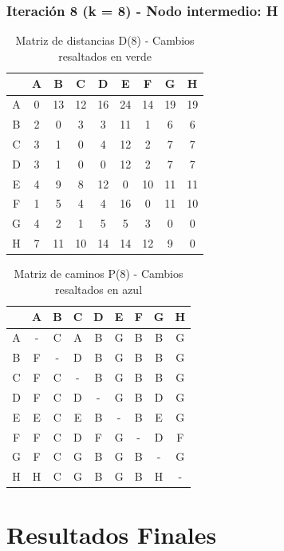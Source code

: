 \documentclass[12pt]{article}
\begin{document}
\clearpage
\subsubsection{Iteración 8 (k = 8) - Nodo intermedio: H}
\begin{table}[h!]
\centering
\begin{tabular}{|c|c|c|c|c|c|c|c|c|}
\hline
 & A & B & C & D & E & F & G & H \\\hline
A & 0 & 13 & 12 & 16 & 24 & 14 & 19 & 19 \\\hline
B & 2 & 0 & 3 & 3 & 11 & 1 & 6 & 6 \\\hline
C & 3 & 1 & 0 & 4 & 12 & 2 & 7 & 7 \\\hline
D & 3 & 1 & 0 & 0 & 12 & 2 & 7 & 7 \\\hline
E & 4 & 9 & 8 & 12 & 0 & 10 & 11 & 11 \\\hline
F & 1 & 5 & 4 & 4 & 16 & 0 & 11 & 10 \\\hline
G & 4 & 2 & 1 & 5 & 5 & 3 & 0 & 0 \\\hline
H & 7 & 11 & 10 & 14 & 14 & 12 & 9 & 0 \\\hline
\end{tabular}
\caption{Matriz de distancias D(8) - Cambios resaltados en verde}
\end{table}

\begin{table}[h!]
\centering
\begin{tabular}{|c|c|c|c|c|c|c|c|c|}
\hline
 & A & B & C & D & E & F & G & H \\\hline
A & - & C & A & B & G & B & B & G \\\hline
B & F & - & D & B & G & B & B & G \\\hline
C & F & C & - & B & G & B & B & G \\\hline
D & F & C & D & - & G & B & D & G \\\hline
E & E & C & E & B & - & B & E & G \\\hline
F & F & C & D & F & G & - & D & F \\\hline
G & F & C & G & B & G & B & - & G \\\hline
H & H & C & G & B & G & B & H & - \\\hline
\end{tabular}
\caption{Matriz de caminos P(8) - Cambios resaltados en azul}
\end{table}

\clearpage
\section{Resultados Finales}
\end{document}
